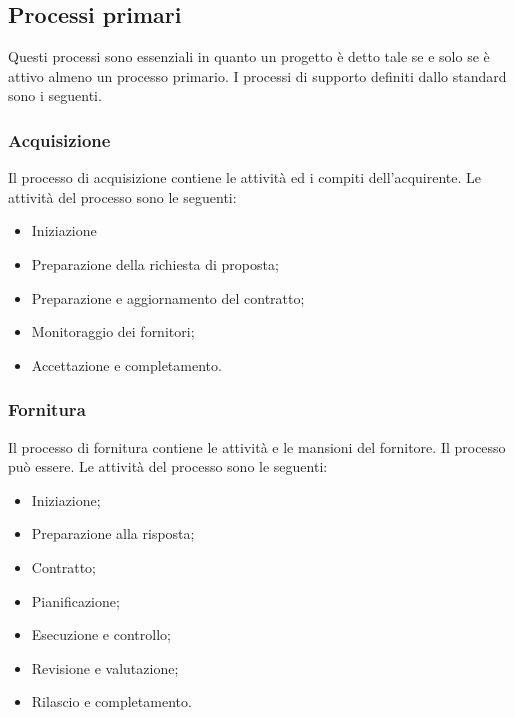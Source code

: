 \subsection{Processi primari}
Questi processi sono essenziali in quanto un progetto è detto tale se e solo se è attivo almeno un processo primario.
I processi di supporto definiti dallo standard sono i seguenti.
\subsubsection{Acquisizione}
Il processo di acquisizione contiene le attività ed i compiti dell'acquirente.
Le attività del processo sono le seguenti:
\begin{itemize}
\item Iniziazione
\item Preparazione della richiesta di proposta;
\item Preparazione e aggiornamento del contratto;
\item Monitoraggio dei fornitori;
\item Accettazione e completamento.
\end{itemize}

\subsubsection{Fornitura}
Il processo di fornitura contiene le attività e le mansioni del fornitore. Il processo può essere.
Le attività del processo sono le seguenti:
\begin{itemize}
\item Iniziazione;
\item Preparazione alla risposta;
\item Contratto;
\item Pianificazione;
\item Esecuzione e controllo;
\item Revisione e valutazione;
\item Rilascio e completamento.
\end{itemize}


